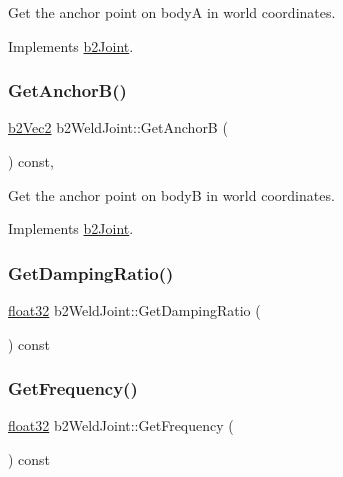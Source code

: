 Get the anchor point on bodyA in world coordinates. 



Implements \mbox{\hyperlink{classb2_joint_abe46ca3aad5db73909a9b5a7b2117447}{b2\+Joint}}.

\mbox{\label{classb2_weld_joint_ac97596e42af760d0a035b15213d3341a}} 
\subsubsection{\texorpdfstring{GetAnchorB()}{GetAnchorB()}}
{\footnotesize\ttfamily \mbox{\hyperlink{structb2_vec2}{b2\+Vec2}} b2\+Weld\+Joint\+::\+Get\+AnchorB (\begin{DoxyParamCaption}{ }\end{DoxyParamCaption}) const\hspace{0.3cm}{\ttfamily [override]}, {\ttfamily [virtual]}}



Get the anchor point on bodyB in world coordinates. 



Implements \mbox{\hyperlink{classb2_joint_a88e947c65d4ea26fe539f02a8cb7f7a9}{b2\+Joint}}.

\mbox{\label{classb2_weld_joint_a603d83491d474156b2c09b59a23bfca4}} 
\subsubsection{\texorpdfstring{GetDampingRatio()}{GetDampingRatio()}}
{\footnotesize\ttfamily \mbox{\hyperlink{b2_settings_8h_aacdc525d6f7bddb3ae95d5c311bd06a1}{float32}} b2\+Weld\+Joint\+::\+Get\+Damping\+Ratio (\begin{DoxyParamCaption}{ }\end{DoxyParamCaption}) const\hspace{0.3cm}{\ttfamily [inline]}}

\mbox{\label{classb2_weld_joint_a36bf80c1c59e28976e286d9ed750b0df}} 
\subsubsection{\texorpdfstring{GetFrequency()}{GetFrequency()}}
{\footnotesize\ttfamily \mbox{\hyperlink{b2_settings_8h_aacdc525d6f7bddb3ae95d5c311bd06a1}{float32}} b2\+Weld\+Joint\+::\+Get\+Frequency (\begin{DoxyParamCaption}{ }\end{DoxyParamCaption}) const\hspace{0.3cm}{\ttfamily [inline]}}

